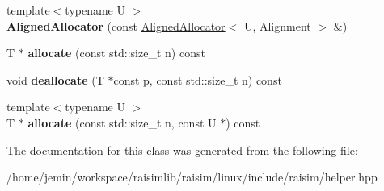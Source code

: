 \begin{DoxyCompactItemize}
{\footnotesize template$<$typename U $>$ }\\{\bfseries Aligned\+Allocator} (const \hyperlink{classraisim_1_1AlignedAllocator}{Aligned\+Allocator}$<$ U, Alignment $>$ \&)
\item 
\mbox{\label{classraisim_1_1AlignedAllocator_ac62ed74a7a9983b11f20efd6f8a210a3}} 
T $\ast$ {\bfseries allocate} (const std\+::size\+\_\+t n) const
\item 
\mbox{\label{classraisim_1_1AlignedAllocator_a044a786dcf52e3acee42eecff22b5616}} 
void {\bfseries deallocate} (T $\ast$const p, const std\+::size\+\_\+t n) const
\item 
\mbox{\label{classraisim_1_1AlignedAllocator_add2f0138c3991a5185648f3fb9ad6c42}} 
{\footnotesize template$<$typename U $>$ }\\T $\ast$ {\bfseries allocate} (const std\+::size\+\_\+t n, const U $\ast$) const
\end{DoxyCompactItemize}


The documentation for this class was generated from the following file\+:\begin{DoxyCompactItemize}
\item 
/home/jemin/workspace/raisimlib/raisim/linux/include/raisim/helper.\+hpp\end{DoxyCompactItemize}
